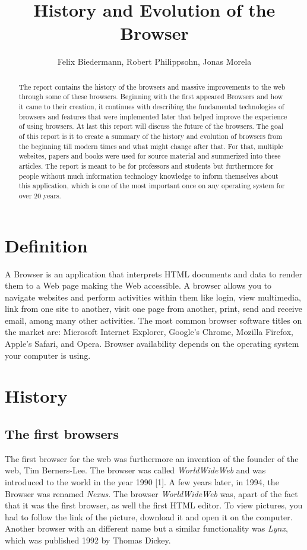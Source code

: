 \documentclass[runningheads]{llncs}
\title{History and Evolution of the Browser}
\author{Felix Biedermann, Robert Philippsohn, Jonas Morela}
\institute{University of Stuttgart, Institute for Architecture of Application Systems \\
Universitätsstraße 38, 70569 Stuttgart, Germany}
\begin{document}
\raggedbottom
\maketitle

	\begin{abstract}
			The report contains the history of the browsers and massive improvements to the web through some of these browsers. Beginning with the first appeared Browsers and how it came to their creation, it continues with describing the fundamental technologies of browsers and features that were implemented later that helped improve the experience of using browsers. At last this report will discuss the future of the browsers. The
			goal of this report is it to create a summary of the history and evolution of browsers from the beginning till modern times and what might change after that. For that, multiple websites, papers and books were used for source material and summerized into these articles. The report is meant to be for professors and students but furthermore for people without much information technology knowledge to inform themselves about this application, which is one of the most important once on any operating system for over 20 years.
	\end{abstract}

	\section{Definition}
		A Browser is an application that interprets HTML documents and data to render them to a Web page making the Web accessible. A browser allows you to navigate websites and perform activities within them like login, view multimedia, link from one site to another, visit one page from another, print, send and receive email, among many other activities. The most common browser software titles on the market are: Microsoft Internet Explorer, Google's Chrome, Mozilla Firefox, Apple's Safari, and Opera. Browser availability depends on the operating system your computer is using.
	\section{History}
		\subsection{The first browsers}
		The first browser for the web was furthermore an invention of the founder of the web, Tim Berners-Lee. The browser was called \textit{WorldWideWeb} and was introduced to the world in the year 1990 [1]. A few years later, in 1994, the Browser was renamed \textit{Nexus}. The browser \textit{WorldWideWeb} was, apart of the fact that it was the first browser, as well the first HTML editor.
		To view pictures, you had to follow the link of the picture, download it and open it on the computer. Another browser with an different name but a similar functionality was \textit{Lynx}, which was published 1992 by Thomas Dickey.
\end{document}
